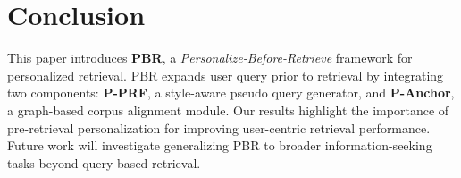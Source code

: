 \section{Conclusion}

This paper introduces \textbf{PBR}, a \textit{Personalize-Before-Retrieve} framework for personalized retrieval. PBR expands user query prior to retrieval by integrating two components: \textbf{P-PRF}, a style-aware pseudo query generator, and \textbf{P-Anchor}, a graph-based corpus alignment module. 
Our results highlight the importance of pre-retrieval personalization for improving user-centric retrieval performance.
Future work will investigate generalizing PBR to broader information-seeking tasks beyond query-based retrieval.